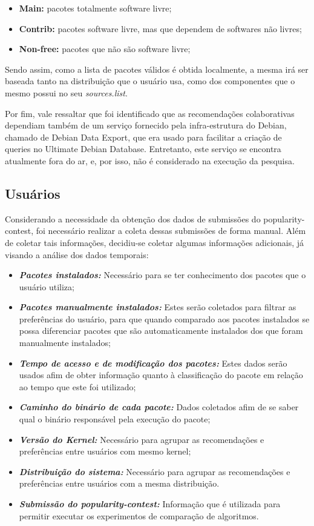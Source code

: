 \begin{itemize}
    \item \textbf{Main:} pacotes totalmente software livre;
    \item \textbf{Contrib:} pacotes software livre, mas que dependem de
        softwares não livres;
    \item \textbf{Non-free:} pacotes que não são software livre;
\end{itemize}

Sendo assim, como a lista de pacotes válidos é obtida localmente, a mesma irá ser baseada tanto na
distribuição que o usuário usa, como dos componentes que o mesmo possui no seu
\textit{sources.list}.

Por fim, vale ressaltar que foi identificado que as recomendações
colaborativas dependiam também de um serviço fornecido pela infra-estrutura do
Debian, chamado de Debian Data Export, que era usado para facilitar a criação de
queries no Ultimate Debian Database. Entretanto, este serviço se encontra
atualmente fora do ar, e, por isso, não é considerado na execução da pesquisa.

\subsection{Usuários} \label{sec:coleta_dados_usuario}

Considerando a necessidade da obtenção dos dados de submissões do
popularity-contest, foi necessário realizar a coleta dessas submissões
de forma manual. Além de coletar tais informações, decidiu-se coletar algumas
informações adicionais, já visando a análise dos dados temporais:

\begin{itemize}
    \item \textit{\textbf{Pacotes instalados:}} Necessário para se ter conhecimento dos pacotes que o usuário utiliza;
    \item \textit{\textbf{Pacotes manualmente instalados:}} Estes serão coletados para filtrar as preferências do usuário, para que quando comparado aos pacotes instalados se possa diferenciar pacotes que são automaticamente instalados dos que foram manualmente instalados;
    \item \textit{\textbf{Tempo de acesso e de modificação dos pacotes:}} Estes dados serão usados afim de obter
        informação quanto à classificação do pacote em relação ao tempo que este foi utilizado;
    \item \textit{\textbf{Caminho do binário de cada pacote:}} Dados coletados afim de se saber qual o binário responsável pela execução do pacote;
    \item \textit{\textbf{Versão do Kernel:}} Necessário para agrupar as recomendações e preferências entre usuários com mesmo kernel;
    \item \textit{\textbf{Distribuição do sistema:}} Necessário para agrupar as recomendações e preferências entre usuários com a mesma distribuição.
    \item \textit{\textbf{Submissão do popularity-contest:}} Informação que é
        utilizada para permitir executar os experimentos de comparação de
        algoritmos.
\end{itemize}

